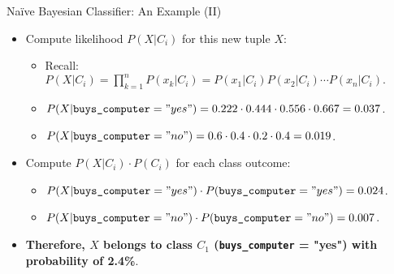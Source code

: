 \begin{frame}{Naïve Bayesian Classifier: An Example (II)}
	\begin{itemize}
		\item Compute likelihood $P(X|C_i)$ for this new tuple $X$:
		      \begin{itemize}
			      \item Recall: $P(X|C_i) = \prod_{k=1}^{n} P(x_k|C_i) = P(x_1|C_i)P(x_2|C_i)\cdots P(x_n|C_i).$
			      \item $P(X | \texttt{buys\_computer} = "yes") = 0.222 \cdot 0.444 \cdot 0.556 \cdot 0.667 = 0.037$.
			      \item $P(X | \texttt{buys\_computer} = "no") = 0.6 \cdot 0.4 \cdot 0.2 \cdot 0.4 = 0.019$.
		      \end{itemize}
		\item Compute $P(X | C_i) \cdot P(C_i)$ for each class outcome:
		      \begin{itemize}
			      \item $P(X | \texttt{buys\_computer} = "yes") \cdot  P(\texttt{buys\_computer} = "yes") = 0.024$.
			      \item $P(X | \texttt{buys\_computer} = "no") \cdot  P(\texttt{buys\_computer} = "no") = 0.007$.
		      \end{itemize}
		\item \textbf{Therefore, $X$ belongs to class $C_1$ (\texttt{buys\_computer} = "yes") with probability of 2.4\%}.
	\end{itemize}
\end{frame}

